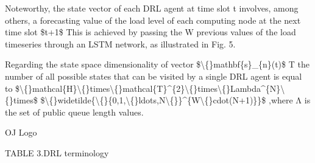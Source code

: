 \documentclass{article}
\begin{document}
Noteworthy, the state vector of each DRL agent at time slot t involves, among others, a forecasting value of the load level of each computing node at the next time slot \$t+1\$ This is achieved by passing the W previous values of the load timeseries through an LSTM network, as illustrated in Fig. 5.

Regarding the state space dimensionality of vector \$\textbackslash\{\}mathbf\{s\}\_\{n\}(t)\$ T the number of all possible states that can be visited by a single DRL agent is equal to \$\textbackslash\{\}mathcal\{H\}\textbackslash\{\}times\textbackslash\{\}mathcal\{T\}\textasciicircum{}\{2\}\textbackslash\{\}times\textbackslash\{\}Lambda\textasciicircum{}\{N\}\textbackslash\{\}times\$ \$\textbackslash\{\}widetilde\{\textbackslash\{\}\{0,1,\textbackslash\{\}ldots,N\textbackslash\{\}\}\textasciicircum{}\{W\textbackslash\{\}cdot(N+1)\}\}\$ ,where Λ is the set of public queue length values.

OJ Logo

TABLE 3.DRL terminology
\end{document}
